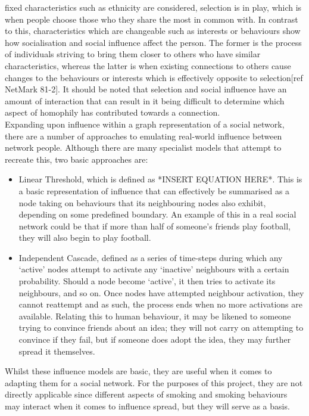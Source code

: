 \documentclass[]{report}
\begin{document}
fixed characteristics such as ethnicity are considered, selection is in play, which is when people choose those who they share the most in common with. In contrast to this, characteristics which are changeable such as interests or behaviours show how socialisation and social influence affect the person. The former is the process of individuals striving to bring them closer to others who have similar characteristics, whereas the latter is when existing connections to others cause changes to the behaviours or interests which is effectively opposite to selection[ref NetMark 81-2]. It should be noted that selection and social influence have an amount of interaction that can result in it being difficult to determine which aspect of homophily has contributed towards a connection.\\
Expanding upon influence within a graph representation of a social network, there are a number of approaches to emulating real-world influence between network people. Although there are many specialist models that attempt to recreate this, two  basic approaches are:
\begin{itemize}
\item Linear Threshold, which is defined as *INSERT EQUATION HERE*. This is a basic representation of influence that can effectively be summarised as a node taking on behaviours that its neighbouring nodes also exhibit, depending on some predefined boundary. An example of this in a real social network could be that if more than half of someone's friends play football, they will also begin to play football.
\item Independent Cascade, defined as a series of time-steps during which any `active' nodes attempt to activate any `inactive' neighbours with a certain probability. Should a node become `active', it then tries to activate its neighbours, and so on. Once nodes have attempted neighbour activation, they cannot reattempt and as such, the process ends when no more activations are available. Relating this to human behaviour, it may be likened to someone trying to convince friends about an idea; they will not carry on attempting to convince if they fail, but if someone does adopt the idea, they may further spread it themselves.
\end{itemize}
Whilst these influence models are basic, they are useful when it comes to adapting them for a social network. For the purposes of this project, they are not directly applicable since different aspects of smoking and smoking behaviours may interact when it comes to influence spread, but they will serve as a basis. \\
\end{document}
